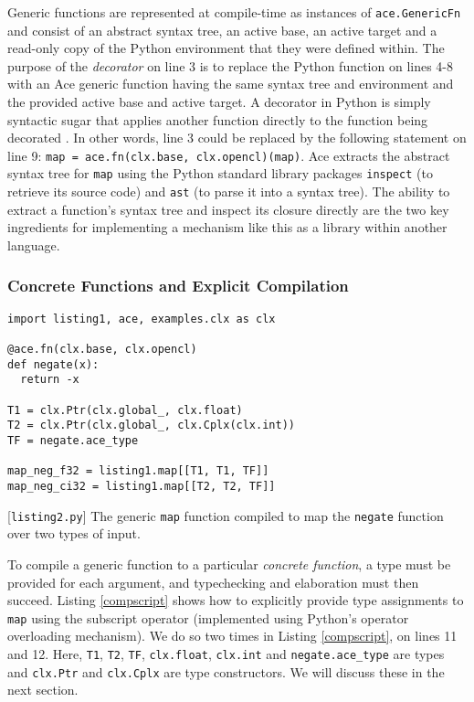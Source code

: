 Generic functions are represented at compile-time as instances of \verb|ace.GenericFn| and consist of an abstract syntax tree, an {active base}, an {active target} and a read-only copy of the Python environment that they were defined within. The purpose of the \emph{decorator} on line 3 is to replace the Python function on lines 4-8 with an Ace generic function having the same syntax tree and environment and the provided active base and active target. 
A decorator in Python is simply syntactic sugar that applies another function directly to the function  being decorated \cite{python}. In other words, line 3 could be replaced by the following  statement on line 9: \verb|map = ace.fn(clx.base, clx.opencl)(map)|.
Ace extracts the abstract syntax tree for \verb|map| using the Python standard  library packages  \verb|inspect| (to retrieve its source code) and \verb|ast| (to parse it into a syntax tree). The ability to extract a function's syntax tree and inspect its closure directly are the two key ingredients for implementing a mechanism like this as a library within another language.

\subsubsection{Concrete Functions and Explicit Compilation}
\begin{codelisting}
\begin{lstlisting}
import listing1, ace, examples.clx as clx

@ace.fn(clx.base, clx.opencl)
def negate(x):
  return -x

T1 = clx.Ptr(clx.global_, clx.float)
T2 = clx.Ptr(clx.global_, clx.Cplx(clx.int))
TF = negate.ace_type

map_neg_f32 = listing1.map[[T1, T1, TF]]
map_neg_ci32 = listing1.map[[T2, T2, TF]]
\end{lstlisting}
%
\caption{[\texttt{listing2.py}] The generic \texttt{map} function compiled to map the \texttt{negate} function over two  types of input.}
\label{compscript}
\end{codelisting}

To compile a generic function to a particular \emph{concrete function}, a type must be provided for each argument, and typechecking and elaboration must then succeed. Listing \ref{compscript} shows how to explicitly provide type assignments to \verb|map| using the subscript operator (implemented using Python's operator overloading mechanism). We do so two times in Listing \ref{compscript}, on lines 11 and 12. Here, \verb|T1|, \verb|T2|, \verb|TF|, \verb|clx.float|, \verb|clx.int| and \verb|negate.ace_type| are types and \verb|clx.Ptr| and \verb|clx.Cplx| are type constructors. We will discuss these in the next section.
 
